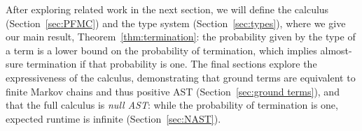 \documentclass[a4paper,UKenglish,cleveref, autoref, thm-restate]{lipics-v2021}
\newcommand\PFMC{\textrm{PFMC}}
\newcommand\PFMCT{\PFMC$^{\,\smallbin{\Rightarrow\oplus}}$}
\begin{document}
After exploring related work in the next section, we will define the calculus (Section~\ref{sec:PFMC}) and the type system (Section~\ref{sec:types}), where we give our main result, Theorem~\ref{thm:termination}: the probability given by the type of a term is a lower bound on the probability of termination, which implies almost-sure termination if that probability is one. The final sections explore the expressiveness of the calculus, demonstrating that ground terms are equivalent to finite Markov chains and thus positive AST (Section~\ref{sec:ground terms}), and that the full calculus is \emph{null AST}: while the probability of termination is one, expected runtime is infinite (Section~\ref{sec:NAST}).


\end{document}

